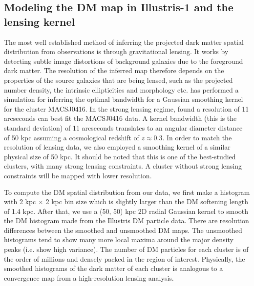 \subsection{Modeling the DM map in Illustris-1 and the lensing kernel}
\label{subsec:DM_map}
The most well established method of inferring the projected dark matter spatial 
distribution from observations is through gravitational lensing.
It works by detecting subtle image distortions of background galaxies due to
the foreground dark matter. The resolution of the inferred map therefore 
depends on the properties of the source galaxies that are being lensed, 
such as the projected number density, the intrinsic ellipticities and morphology etc.
\cite{Hoag2016} has performed a simulation for inferring the optimal bandwidth
for a Gaussian smoothing kernel for the cluster MACSJ0416. 
In the strong lensing regime, \cite{Hoag2016} found a resolution of 11 arcseconds
can best fit the MACSJ0416 data. A kernel bandwidth (this is the standard deviation) 
of 11 arcseconds translates to an angular diameter distance of 50 
kpc assuming a cosmological redshift of $z \approx 0.3$. 
In order to match the resolution of lensing data,
we also employed a smoothing kernel of a similar physical size of 50 kpc.  
It should be noted that this is one of the best-studied clusters, 
with many strong lensing constraints. 
A cluster without strong lensing constraints will be mapped with 
lower resolution.

To compute the DM spatial distribution from our data, we first make a histogram with 2 kpc
$\times$ 2 kpc bin size which is slightly larger than the DM softening length of 1.4 kpc. 
After that, we use a (50, 50) kpc 2D radial Gaussian kernel 
to smooth the DM histogram made from the Illustris DM
particle data. 
There are resolution differences between the smoothed and unsmoothed DM
maps. The unsmoothed histograms tend to show many more local maxima around the major
density peaks (i.e. show high variance). 
The number of DM particles for each cluster is of 
the order of millions and densely packed in the region of
interest. 
Physically, the smoothed histograms of the dark matter of each cluster 
is analogous to a convergence map from a high-resolution lensing analysis. 


